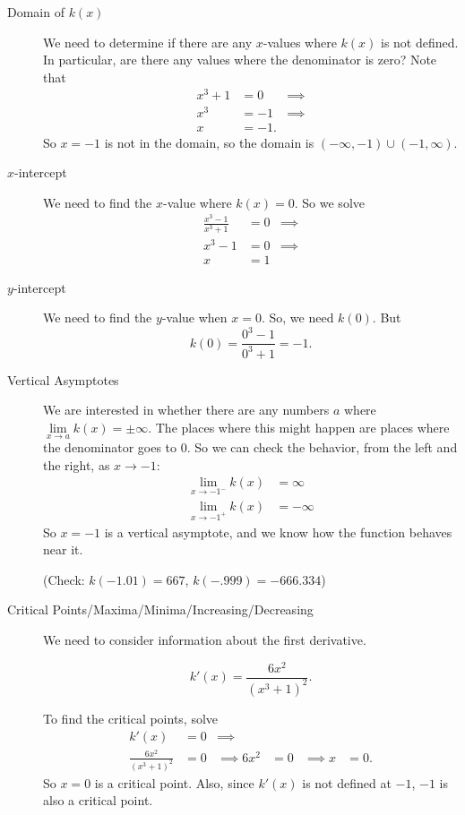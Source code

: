 \documentclass[10pt]{amsart}
\theoremstyle{definition}
\theoremstyle{remark}
\begin{document}
\begin{description}
\item[Domain of $k(x)$]

We need to determine if there are any $x$-values where $k(x)$ is not defined. In particular, are there any values where the denominator is zero? Note that 
\begin{align*}
x^{3}+1 &= 0 &\implies\\
x^{3} &= -1 & \implies \\
x &= -1.
\end{align*}
So $x = -1$ is not in the domain, so the domain is $(-\infty, -1) \cup (-1, \infty)$.

\item[$x$-intercept]

We need to find the $x$-value where $k(x) = 0$. So we solve
\begin{align*}
\frac{x^{3} - 1}{x^{3}+1} &= 0 & \implies \\
x^{3} - 1 &= 0 & \implies \\
x &= 1
\end{align*}
%
\item[$y$-intercept] 

We need to find the $y$-value when $x = 0$. So, we need $k(0)$. But $$k(0) = \frac{0^{3} - 1}{0^{3}+1} = -1.$$

\item[Vertical Asymptotes]

We are interested in whether there are any numbers $a$ where $\lim\limits_{x\to a}k(x) = \pm \infty$. The places where this might happen are places where the denominator goes to 0. So we can check the behavior, from the left and the right, as $x \to -1$:
%
\begin{align*}
\lim\limits_{x\to -1^{-}} k(x) &= \infty \\
\lim\limits_{x\to -1^{+}} k(x) &= -\infty
\end{align*}
So $x = -1$ is a vertical asymptote, and we know how the function behaves near it.

(Check: $k(-1.01) = 667$, $k(-.999) = -666.334$)

\item[Critical Points/Maxima/Minima/Increasing/Decreasing]

We need to consider information about the first derivative. 

$$k'(x)=\frac{6 x^2}{\left(x^3+1\right)^2}.$$

To find the critical points, solve 
\begin{align*}
k'(x) &= 0 & \implies \\
\frac{6 x^2}{\left(x^3+1\right)^2} & = 0 & \implies
6 x^{2} & = 0 & \implies
x &= 0.
\end{align*}
So $x = 0$ is a critical point. Also, since $k'(x)$ is not defined at $-1$, $-1$ is also a critical point.


\end{description}
\end{document}
